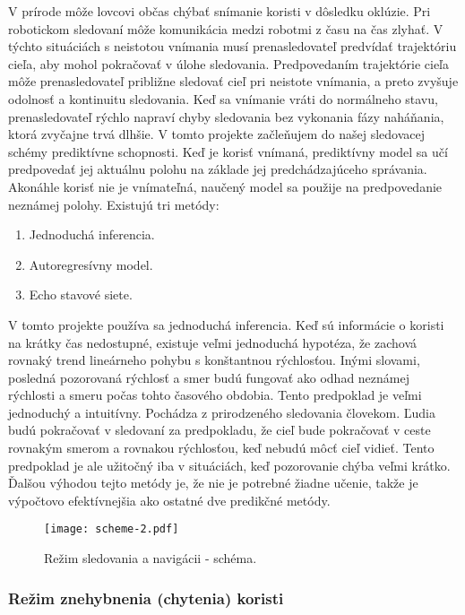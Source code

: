 \justifying
\noindent
V prírode môže lovcovi občas chýbať snímanie koristi v dôsledku oklúzie. Pri robotickom sledovaní môže komunikácia medzi robotmi z času na čas zlyhať. V týchto situáciách s neistotou vnímania musí prenasledovateľ predvídať trajektóriu cieľa, aby mohol pokračovať v úlohe sledovania. Predpovedaním trajektórie cieľa môže prenasledovateľ približne sledovať cieľ pri neistote vnímania, a preto zvyšuje odolnosť a kontinuitu sledovania. Keď sa vnímanie vráti do normálneho stavu, prenasledovateľ rýchlo napraví chyby sledovania bez vykonania fázy naháňania, ktorá zvyčajne trvá dlhšie.
V tomto projekte začleňujem do našej sledovacej schémy prediktívne schopnosti. Keď je korisť vnímaná, prediktívny model sa učí predpovedať jej aktuálnu polohu na základe jej predchádzajúceho správania. Akonáhle korisť nie je vnímateľná, naučený model sa použije na predpovedanie neznámej polohy.
Existujú tri metódy:
\begin{enumerate}
    \item Jednoduchá inferencia.
    \item Autoregresívny model.
    \item Echo stavové siete. 
\end{enumerate} 
V tomto projekte používa sa jednoduchá inferencia. Keď sú informácie o koristi na krátky čas nedostupné, existuje veľmi jednoduchá hypotéza, že zachová rovnaký trend lineárneho pohybu s konštantnou rýchlosťou. Inými slovami, posledná pozorovaná rýchlosť a smer budú fungovať ako odhad neznámej rýchlosti a smeru počas tohto časového obdobia.
Tento predpoklad je veľmi jednoduchý a intuitívny. Pochádza z prirodzeného sledovania človekom. Ľudia budú pokračovať v sledovaní za predpokladu, že cieľ bude pokračovať v ceste rovnakým smerom a rovnakou rýchlosťou, keď nebudú môcť cieľ vidieť. Tento predpoklad je ale užitočný iba v situáciách, keď pozorovanie chýba veľmi krátko. Ďalšou výhodou tejto metódy je, že nie je potrebné žiadne učenie, takže je výpočtovo efektívnejšia ako ostatné dve predikčné metódy. 

\begin{figure}[ht!]
    \centering
    \texttt{[image: scheme-2.pdf]}
    \caption{Režim sledovania a navigácii - schéma.}
    \label{o:38}
\end{figure}

\subsubsection{Režim znehybnenia (chytenia) koristi}

